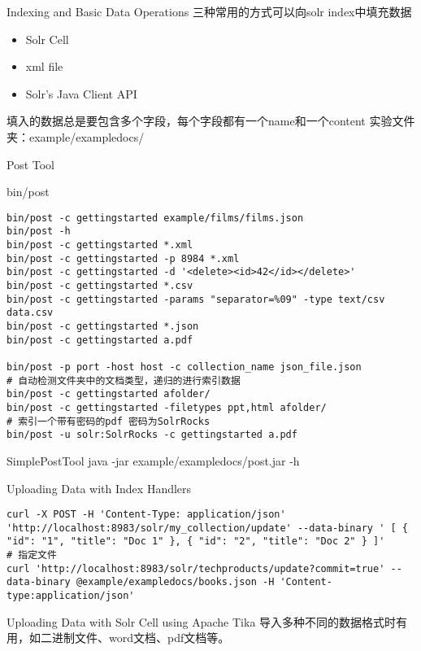 \documentclass[presentation]{beamer}
\begin{document}
\begin{frame}[fragile,label={sec:org6131507}]{Indexing and Basic Data Operations}
 三种常用的方式可以向solr index中填充数据
\begin{itemize}
\item Solr Cell
\item xml file
\item Solr's Java Client API
\end{itemize}
填入的数据总是要包含多个字段，每个字段都有一个name和一个content
实验文件夹：example/exampledocs/

\begin{block}{Post Tool}
\begin{block}{bin/post}
\begin{verbatim}
bin/post -c gettingstarted example/films/films.json
bin/post -h
bin/post -c gettingstarted *.xml
bin/post -c gettingstarted -p 8984 *.xml
bin/post -c gettingstarted -d '<delete><id>42</id></delete>'
bin/post -c gettingstarted *.csv
bin/post -c gettingstarted -params "separator=%09" -type text/csv data.csv
bin/post -c gettingstarted *.json
bin/post -c gettingstarted a.pdf

bin/post -p port -host host -c collection_name json_file.json
# 自动检测文件夹中的文档类型，递归的进行索引数据
bin/post -c gettingstarted afolder/
bin/post -c gettingstarted -filetypes ppt,html afolder/
# 索引一个带有密码的pdf 密码为SolrRocks
bin/post -u solr:SolrRocks -c gettingstarted a.pdf
\end{verbatim}
\end{block}


\begin{block}{SimplePostTool}
java -jar example/exampledocs/post.jar -h
\end{block}
\end{block}


\begin{block}{Uploading Data with Index Handlers}
\begin{verbatim}
curl -X POST -H 'Content-Type: application/json' 'http://localhost:8983/solr/my_collection/update' --data-binary ' [ { "id": "1", "title": "Doc 1" }, { "id": "2", "title": "Doc 2" } ]'
# 指定文件
curl 'http://localhost:8983/solr/techproducts/update?commit=true' --data-binary @example/exampledocs/books.json -H 'Content-type:application/json'
\end{verbatim}
\end{block}


\begin{block}{Uploading Data with Solr Cell using Apache Tika}
导入多种不同的数据格式时有用，如二进制文件、word文档、pdf文档等。
\end{block}
\end{frame}
\end{document}
